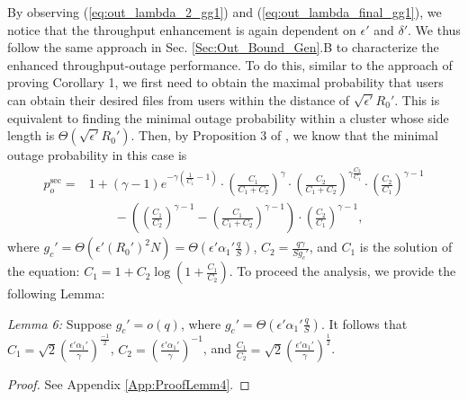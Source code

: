 \documentclass[journal,draftclsnofoot,onecolumn,12pt,twoside]{IEEEtran}
\begin{document}
By observing (\ref{eq:out_lambda_2_gg1}) and (\ref{eq:out_lambda_final_gg1}), we notice that the throughput enhancement is again dependent on $\epsilon'$ and $\delta'$. We thus follow the same approach in Sec. \ref{Sec:Out_Bound_Gen}.B to characterize the enhanced throughput-outage performance. To do this, similar to the approach of proving Corollary 1, we first need to obtain the maximal probability that users can obtain their desired files from users within the distance of $\sqrt{\epsilon'} R_0'$. This is equivalent to finding the minimal outage probability within a cluster whose side length is $\Theta\left(\sqrt{\epsilon'} R_0'\right)$. Then, by Proposition 3 of \cite{lee2020optimal}, we know that the minimal outage probability in this case is
\begin{equation}
\begin{aligned}\label{eq:Pout_sg_gg1}
p_o^{\text{sec}}=& 1+(\gamma-1)e^{-\gamma\left(\frac{1}{C_1}-1\right)}\cdot\left(\frac{C_1}{C_1+C_2}\right)^{\gamma}\cdot\left(\frac{C_2}{C_1+C_2}\right)^{\gamma\frac{ C_2}{C_1}}\cdot\left(\frac{C_2}{C_1}\right)^{\gamma-1}\\
&\qquad-\left(\left(\frac{C_1}{C_2}\right)^{\gamma-1}-\left(\frac{C_1}{C_1+C_2}\right)^{\gamma-1}\right)\cdot\left(\frac{C_2}{C_1}\right)^{\gamma-1},
\end{aligned}
\end{equation} 
where $g_c'=\Theta\left(\epsilon'(R_0')^2N\right)=\Theta\left(\epsilon'\alpha_1'\frac{q}{S}\right)$, $C_2=\frac{q\gamma}{Sg_c'}$, and $C_1$ is the solution of the equation: $C_1=1+C_2\log\left(1+\frac{C_1}{C_2}\right)$. To proceed the analysis, we provide the following Lemma:

{\em Lemma 6:} Suppose $g_c'=o(q)$, where $g_c'=\Theta\left(\epsilon'\alpha_1'\frac{q}{S}\right)$. It follows that $C_1=\sqrt{2}\left(\frac{\epsilon'\alpha_1'}{\gamma}\right)^{\frac{-1}{2}}$, $C_2=\left(\frac{\epsilon'\alpha_1'}{\gamma}\right)^{-1}$, and $\frac{C_1}{C_2}=\sqrt{2}\left(\frac{\epsilon'\alpha_1'}{\gamma}\right)^{\frac{1}{2}}$.
\begin{proof}
See Appendix \ref{App:ProofLemm4}.
\end{proof}
\end{document}
